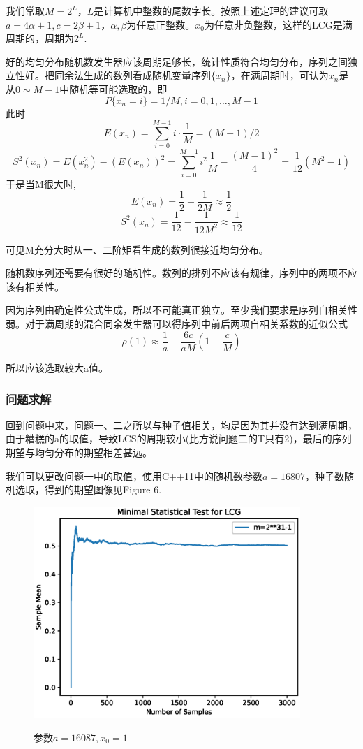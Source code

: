 \documentclass[12pt,a4paper]{article}%
\begin{document}
    我们常取$M=2^L$，$L$是计算机中整数的尾数字长。按照上述定理的建议可取$a=4\alpha+1,c=2\beta+1$，$\alpha,\beta$为任意正整数。$x_0$为任意非负整数，这样的LCG是满周期的，周期为$2^L$.

    好的均匀分布随机数发生器应该周期足够长，统计性质符合均匀分布，序列之间独立性好。把同余法生成的数列看成随机变量序列$\{x_n\}$，在满周期时，可认为$x_n$是从$0\sim M-1$中随机等可能选取的，即
    \[P\{x_n=i\}=1/M,i=0,1,\ldots,M-1\]
    此时
    \[E\left( x_n \right)=\sum_{i=0}^{M-1}i\cdot\frac{1}{M}=(M-1)/2\]
    \[S^2 \left( x_n \right)=E\left( x_n^2 \right)-\left( E\left( x_n \right) \right)^2 =\sum^{M-1}_{i=0}i^2\frac{1}{M}-\frac{\left( M-1 \right)^2}{4}=\frac{1}{12}\left( M^2-1 \right)\]
    于是当M很大时,
    \[E\left( x_n \right)=\frac{1}{2}-\frac{1}{2M}\approx \frac{1}{2}\]
    \[S^2 \left( x_n \right)=\frac{1}{12}-\frac{1}{12M^2}\approx\frac{1}{12}\]

    可见M充分大时从一、二阶矩看生成的数列很接近均匀分布。

    随机数序列还需要有很好的随机性。数列的排列不应该有规律，序列中的两项不应该有相关性。


    因为序列由确定性公式生成，所以不可能真正独立。至少我们要求是序列自相关性弱。对于满周期的混合同余发生器可以得序列中前后两项自相关系数的近似公式
    \[\rho\left( 1 \right)\approx \frac{1}{a}-\frac{6c}{aM}\left( 1-\frac{c}{M} \right)\]

    所以应该选取较大a值。

    \subsubsection{问题求解}
    回到问题中来，问题一、二之所以与种子值相关，均是因为其并没有达到满周期，由于糟糕的a的取值，导致LCS的周期较小(比方说问题二的T只有2)，最后的序列期望与均匀分布的期望相差甚远。

    我们可以更改问题一中的取值，使用C++11中的随机数参数$a=16807$，种子数随机选取，得到的期望图像见Figure 6.
    \begin{figure}[htbp]
        \centering
        \includegraphics[height=8cm]{Problem_3}\label{fig:figure4}
        \caption{参数$a=16087,x_0=1$}
    \end{figure}
\end{document}
